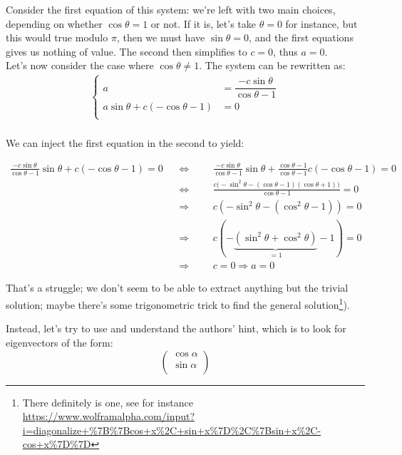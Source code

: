 \documentclass[solutions.tex]{subfiles}
\begin{document}
Consider the first equation of this system: we're left
with two main choices, depending on whether
$\cos\theta = 1$ or not. If it is, let's take $\theta=0$
for instance, but this would true modulo $\pi$, then
we must have $\sin\theta=0$, and the first equations gives
us nothing of value. The second then simplifies to $c=0$, thus $a=0$. \\

Let's now consider the case where $\cos\theta \neq 1$.
The system can be rewritten as:
\begin{equation*}\begin{aligned}
	\begin{cases}
		a &= \dfrac{-c\sin\theta}{\cos\theta - 1}\\
		a\sin\theta + c(-\cos\theta-1) & = 0 \\
	\end{cases} \\
\end{aligned}\end{equation*}

We can inject the first equation in the second to yield:

\begin{equation*}\begin{aligned}
	\frac{-c\sin\theta}{\cos\theta - 1}\sin\theta + c(-\cos\theta-1) = 0
	&&\Leftrightarrow&&&
	\frac{-c\sin\theta}{\cos\theta - 1}\sin\theta + \frac{\cos\theta-1}{\cos\theta-1}c(-\cos\theta-1) = 0 \\
	&&\Leftrightarrow&&&
	\frac{c\bigl(-\sin^2\theta - (\cos\theta-1)(\cos\theta+1)\bigr)}{\cos\theta-1} = 0 \\
	&&\Rightarrow&&&
		c(-\sin^2\theta - (\cos^2\theta-1)) = 0 \\
	&&\Rightarrow&&&
		c(-\underbrace{(\sin^2\theta+\cos^2\theta)}_{=1}-1) = 0 \\
	&&\Rightarrow&&&
		c = 0 \Rightarrow a = 0
\end{aligned}\end{equation*}

That's a struggle; we don't seem to be able to extract anything
but the trivial solution; maybe there's some trigonometric trick to
find the general
solution\footnote{There definitely is one, see for instance \url{https://www.wolframalpha.com/input?i=diagonalize+\%7B\%7Bcos+x\%2C+sin+x\%7D\%2C\%7Bsin+x\%2C-cos+x\%7D\%7D}}). \\

\hrr

Instead, let's try to use and understand the authors' hint,
which is to look for eigenvectors of the form:
\[
	\begin{pmatrix}
		\cos\alpha \\
		\sin\alpha \\
	\end{pmatrix}
\]
\end{document}

